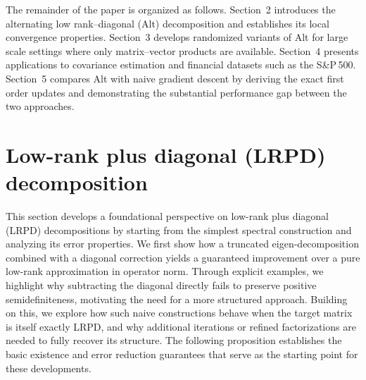 \documentclass[final,hidelinks,onefignum,onetabnum]{siamart250211}
\providecommand{\1}{\mathbf{1}}
\theoremstyle{plain}
\begin{document}
The remainder of the paper is organized as follows.  Section~2 introduces the alternating low
rank–diagonal (Alt) decomposition and establishes its local convergence properties.  Section~3
develops randomized variants of Alt for large scale settings where only matrix–vector products are
available.  Section~4 presents applications to covariance estimation and financial datasets such as
the S\&P\,500.  Section~5 compares Alt with naive gradient descent by deriving the exact first order
updates and demonstrating the substantial performance gap between the two approaches.





\section{Low-rank plus diagonal (LRPD) decomposition}

This section develops a foundational perspective on low-rank plus diagonal (LRPD) decompositions by starting from the simplest spectral construction and analyzing its error properties. We first show how a truncated eigen-decomposition combined with a diagonal correction yields a guaranteed improvement over a pure low-rank approximation in operator norm. Through explicit examples, we highlight why subtracting the diagonal directly fails to preserve positive semidefiniteness, motivating the need for a more structured approach. Building on this, we explore how such naive constructions behave when the target matrix is itself exactly LRPD, and why additional iterations or refined factorizations are needed to fully recover its structure. The following proposition establishes the basic existence and error reduction guarantees that serve as the starting point for these developments.
\end{document}

